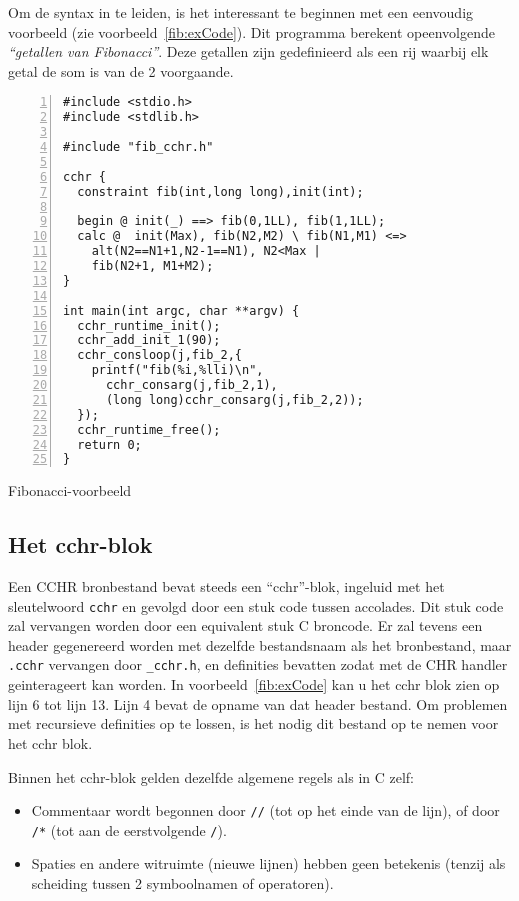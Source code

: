 Om de syntax in te leiden, is het interessant te beginnen met een eenvoudig voorbeeld (zie voorbeeld~\ref{fib:exCode}).
Dit programma berekent opeenvolgende {\em ``getallen van Fibonacci''}. Deze getallen zijn gedefinieerd als een rij waarbij
elk getal de som is van de 2 voorgaande.

\begin{exCode}
\begin{Verbatim}[frame=single,numbers=left]
#include <stdio.h>
#include <stdlib.h>

#include "fib_cchr.h"

cchr {
  constraint fib(int,long long),init(int);

  begin @ init(_) ==> fib(0,1LL), fib(1,1LL);
  calc @  init(Max), fib(N2,M2) \ fib(N1,M1) <=>
    alt(N2==N1+1,N2-1==N1), N2<Max |
    fib(N2+1, M1+M2);
}

int main(int argc, char **argv) {
  cchr_runtime_init();
  cchr_add_init_1(90);
  cchr_consloop(j,fib_2,{
    printf("fib(%i,%lli)\n", 
      cchr_consarg(j,fib_2,1),
      (long long)cchr_consarg(j,fib_2,2));
  });
  cchr_runtime_free();
  return 0;
}
\end{Verbatim}
\caption{\label{fib:exCode} Fibonacci-voorbeeld}
\end{exCode}

\subsection{Het cchr-blok}

Een CCHR bronbestand bevat steeds een ``cchr''-blok, ingeluid met het sleutelwoord {\tt cchr} en gevolgd door een stuk
code tussen accolades. Dit stuk code zal vervangen worden door een equivalent stuk C broncode. Er zal tevens een header
gegenereerd worden met dezelfde bestandsnaam als het bronbestand, maar {\tt .cchr} vervangen door {\tt \_cchr.h}, en
definities bevatten zodat met de CHR handler geinterageert kan worden. In voorbeeld~\ref{fib:exCode} kan u het 
cchr blok zien op lijn 6 tot lijn 13. Lijn 4 bevat de opname van dat header bestand. Om problemen met recursieve
definities op te lossen, is het nodig dit bestand op te nemen voor het cchr blok.

Binnen het cchr-blok gelden dezelfde algemene regels als in C zelf: \begin{itemize}
  \item Commentaar wordt begonnen door {\tt //} (tot op het einde van de lijn), of door {\tt /*} (tot aan de eerstvolgende {\tt */}).
  \item Spaties en andere witruimte (nieuwe lijnen) hebben geen betekenis (tenzij als scheiding tussen 2 symboolnamen of operatoren).
\end{itemize}

